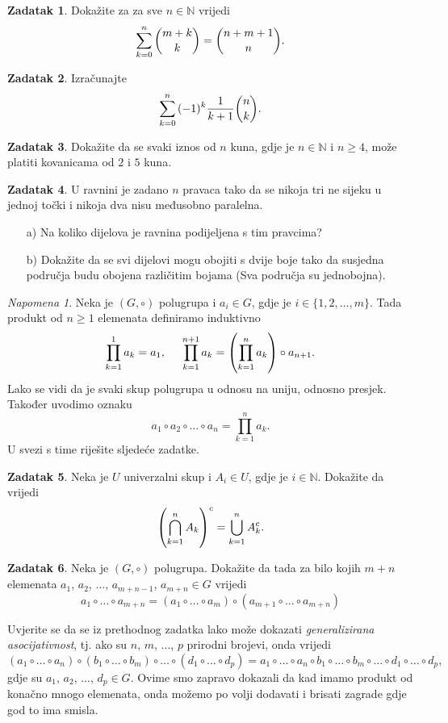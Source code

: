 \documentclass{book}
\let\originalleft\left
\let\originalright\right
\renewcommand{\left}{\mathopen{}\mathclose\bgroup\originalleft}
\renewcommand{\right}{\aftergroup\egroup\originalright}
\theoremstyle{definition}
\theoremstyle{definition}
\newtheorem{exercise}{Zadatak}
\theoremstyle{remark}
\newtheorem{remark}{Napomena}
\begin{document}
\begin{exercise}
Dokažite za za sve $n\in \mathbb{N}$ vrijedi
$$\sum_{k=0}^n{\dbinom{m+k}{k}}=\dbinom{n+m+1}{n}.$$
\end{exercise}
\begin{exercise}
Izračunajte
$$\sum_{k=0}^n{(-1)^k\dfrac{1}{k+1}\dbinom{n}{k}}.$$
\end{exercise}
\begin{exercise}
Dokažite da se svaki iznos od $n$ kuna, gdje je $n\in \mathbb{N}$ i $n\geq 4$, može platiti kovanicama od $2$ i $5$ kuna.
\end{exercise}
\begin{exercise} U ravnini je zadano $n$ pravaca tako da se nikoja tri ne sijeku u jednoj točki i nikoja dva nisu međusobno paralelna.
\begin{itemize}
\item[a)] Na koliko dijelova je ravnina podijeljena s tim pravcima?
\item[b)] Dokažite da se svi dijelovi mogu obojiti s dvije boje tako da susjedna područja budu obojena različitim bojama (Sva područja su jednobojna).
\end{itemize}
\end{exercise}
\begin{remark}
Neka je $(G, \circ)$ polugrupa i $a_i\in G$, gdje je $i\in \{1, 2, \dots, m\}$. Tada produkt od $n\geq 1$ elemenata definiramo induktivno
\begin{gather*}
\prod_{k=1}^{1}{a_k}=a_1,\hspace{0.5cm}
\prod_{k=1}^{n+1}{a_k}=\left(\prod_{k=1}^{n}{a_k}\right)\circ a_{n+1}.
\end{gather*}
Lako se vidi da je svaki skup polugrupa u odnosu na uniju, odnosno presjek. Također uvodimo oznaku
$$a_1\circ a_2\circ \dots\circ a_n=\prod_{k=1}^{n}{a_k}.$$
U svezi s time riješite sljedeće zadatke.
\end{remark}

\begin{exercise}
Neka je $U$ univerzalni skup i $A_i\in U$, gdje je $i\in \mathbb{N}$. Dokažite da vrijedi
$$\left(\bigcap_{k=1}^n{A_k}\right)^c=\bigcup_{k=1}^n{A_k^c}.$$
\end{exercise}
\begin{exercise}
\label{genasoc}
Neka je $(G,\circ)$ polugrupa. Dokažite da tada za bilo kojih $m+n$ elemenata $a_1$, $a_2$, $\dots$, $a_{m+n-1}$, $a_{m+n}\in G$ vrijedi
$$a_1\circ\dots\circ a_{m+n}=(a_1\circ\dots\circ a_m)\circ(a_{m+1}\circ\dots\circ a_{m+n})$$
\end{exercise}
Uvjerite se da se iz prethodnog zadatka lako može dokazati \textit{generalizirana asocijativnost}, tj. ako su $n$, $m$, $...$, $p$ prirodni brojevi, onda vrijedi
$$(a_1\circ\dots \circ a_n)\circ (b_1\circ \dots \circ b_m)\circ\dots\circ (d_1\circ\dots\circ d_p)=a_1\circ\dots\circ a_n\circ b_1\circ\dots\circ b_m\circ\dots\circ d_1\circ\dots\circ d_p,$$
gdje su $a_1$, $a_2$, $...$, $d_p\in G$. Ovime smo zapravo dokazali da kad imamo produkt od konačno mnogo elemenata, onda možemo po volji dodavati i brisati zagrade gdje god to ima smisla.
\end{document}
